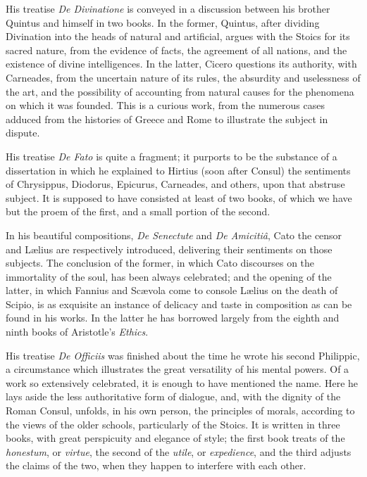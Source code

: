 His treatise \emph{De Divinatione}
is conveyed in a discussion between his brother Quintus and himself in
two books. In the former, Quintus, after dividing Divination into the
heads of natural and artificial, argues with the Stoics for its sacred
nature, from the evidence of facts, the agreement of all nations, and
the existence of divine intelligences. In the latter, Cicero
questions its authority, with Carneades, from the uncertain nature of
its rules, the absurdity and uselessness of the art, and the
possibility of accounting from natural causes for the phenomena on
which it was founded. This is a curious work, from the numerous cases
adduced from the histories of Greece and Rome to illustrate the
subject in dispute.

His treatise \emph{De Fato} is
quite a fragment; it purports to be the substance of a dissertation in
which he explained to Hirtius (soon after Consul) the sentiments of
Chrysippus, Diodorus, Epicurus, Carneades, and others, upon that
abstruse subject. It is supposed to have consisted at least of two
books, of which we have but the proem of the first, and a small
portion of the second.

In his beautiful compositions,
\emph{De Senectute} and \emph{De Amicitiâ}, Cato the censor and Lælius
are respectively introduced, delivering their sentiments on those
subjects. The conclusion of the former, in which Cato discourses on
the immortality of the soul, has been always celebrated; and the
opening of the latter, in which Fannius and Scævola come to console Lælius
on the death of Scipio, is as exquisite an instance of delicacy and
taste in composition as can be found in his works. In the latter he
has borrowed largely from the eighth and ninth books of Aristotle's \emph{Ethics}.

His treatise \emph{De Officiis}
was finished about the time he wrote his second Philippic, a
circumstance which illustrates the great versatility of his mental
powers. Of a work so extensively celebrated, it is enough to have
mentioned the name. Here he lays aside the less authoritative form of
dialogue, and, with the dignity of the Roman Consul, unfolds, in his
own person, the principles of morals, according to the views of the
older schools, particularly of the Stoics. It is written in three
books, with great perspicuity and elegance of style; the first
book treats of the \emph{honestum}, or \emph{virtue}, the second of
the \emph{utile}, or \emph{expedience}, and the third adjusts the
claims of the two, when they happen to interfere with each other.

